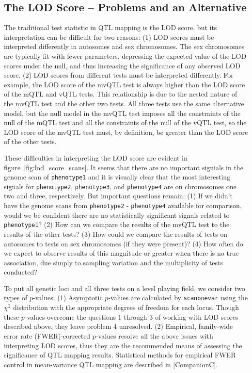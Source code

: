 \documentclass[9pt,twocolumn,twoside]{gsag3jnl}
\begin{document}
\subsection*{The LOD Score -- Problems and an Alternative}
The traditional test statistic in QTL mapping is the LOD score, but its interpretation can be difficult for two reasons:
(1) LOD scores must be interpreted differently in autosomes and sex chromosomes.
The sex chromosomes are typically fit with fewer parameters, depressing the expected value of the LOD scores under the null, and thus increasing the significance of any observed LOD score.
(2) LOD scores from different tests must be interpreted differently.
For example, the LOD score of the mvQTL test is always higher than the LOD score of the mQTL and vQTL tests.
This relationship is due to the nested nature of the mvQTL test and the other two tests.
All three tests use the same alternative model, but the null model in the mvQTL test imposes all the constraints of the null of the mQTL test and all the constraints of the null of the vQTL test, so the LOD score of the mvQTL test must, by definition, be greater than the LOD score of the other tests.

These difficulties in interpreting the LOD score are evident in figure~\ref{fig:lod_score_scans}.
It seems that there are no important signials in the genome scan of \texttt{phenotype1} and it is visually clear that the most interesting signals for \texttt{phenotype2}, \texttt{phenotype3}, and \texttt{phenotype4} are on chromosomes one two and three, respectively.
But important questions remain:
(1) If we didn't have the genome scans from \texttt{phenotype2} - \texttt{phenotype4} available for comparison, would we be confident there are no statistically significant signals related to \texttt{phenotype1}?
(2) How can we compare the results of the mvQTL test to the results of the other tests?
(3) How could we compare the results of tests on autosomes to tests on sex chromosomes (if they were present)?
(4) How often do we expect to observe results of this magnitude or greater when there is no true association, due simply to sampling variation and the multiplicity of tests conducted?

To put all genetic loci and all three tests on a level playing field, we consider two types of $p$-values:
(1) Asymptotic $p$-values are calculated by \texttt{scanonevar} using the $\chi^2$ distribution with the appropriate degrees of freedom for each locus.
Though these $p$-values overcome the questions 1 through 3 of working with LOD scores described above, they leave problem 4 unresolved.
(2) Empirical, family-wide error rate (FWER)-corrected $p$-values resolve all the above issues with interpreting LOD scores, thus they are the recommended means of assessing the significance of QTL mapping results.
Statistical methods for empirical FWER control in mean-variance QTL mapping are described in [CompanionC].
\end{document}
